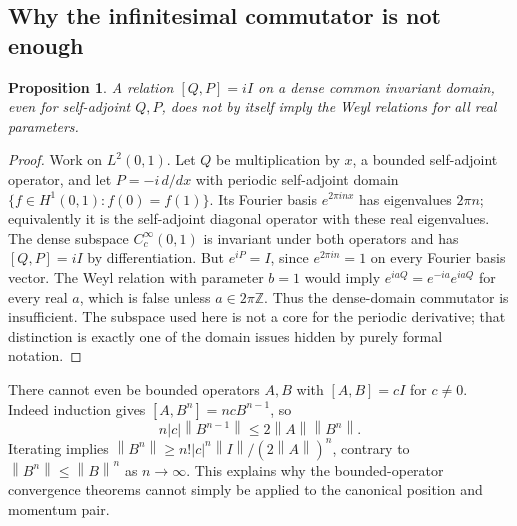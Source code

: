 \documentclass[11pt]{article}
\numberwithin{equation}{section}
\newtheorem{proposition}[proposition]{Proposition}
\theoremstyle{definition}
\theoremstyle{remark}
\newcommand{\Z}{\mathbb{Z}}
\newcommand{\norm}[1]{\left\lVert#1\right\rVert}
\begin{document}
\subsection{Why the infinitesimal commutator is not enough}
\begin{proposition}\label{prop:CCRcounterexample}
A relation $[Q,P]=iI$ on a dense common invariant domain, even for
self-adjoint $Q,P$, does not by itself imply the Weyl relations for
all real parameters.
\end{proposition}
\begin{proof}
Work on $L^2(0,1)$. Let $Q$ be multiplication by $x$, a bounded
self-adjoint operator, and let $P=-i\,d/dx$ with periodic
self-adjoint domain
$\{f\in H^1(0,1):f(0)=f(1)\}$. Its Fourier basis
$e^{2\pi inx}$ has eigenvalues $2\pi n$; equivalently it is the
self-adjoint diagonal operator with these real eigenvalues.
The dense subspace $C_c^\infty(0,1)$ is invariant under both
operators and has $[Q,P]=iI$ by differentiation. But
$e^{iP}=I$, since $e^{2\pi in}=1$ on every Fourier basis vector.
The Weyl relation with parameter $b=1$ would imply
$e^{iaQ}=e^{-ia}e^{iaQ}$ for every real $a$, which is false unless
$a\in2\pi\Z$. Thus the dense-domain commutator is insufficient.
The subspace used here is not a core for the periodic derivative;
that distinction is exactly one of the domain issues hidden by
purely formal notation.
\end{proof}
There cannot even be bounded operators $A,B$ with $[A,B]=cI$ for
$c\ne0$. Indeed induction gives $[A,B^n]=ncB^{n-1}$, so
\[
 n|c|\norm{B^{n-1}}\leq2\norm{A}\norm{B^n}.
\]
Iterating implies
$\norm{B^n}\geq n!|c|^n\norm{I}/(2\norm{A})^n$, contrary to
$\norm{B^n}\leq\norm{B}^n$ as $n\to\infty$.
This explains why the bounded-operator convergence theorems cannot
simply be applied to the canonical position and momentum pair.
\end{document}

